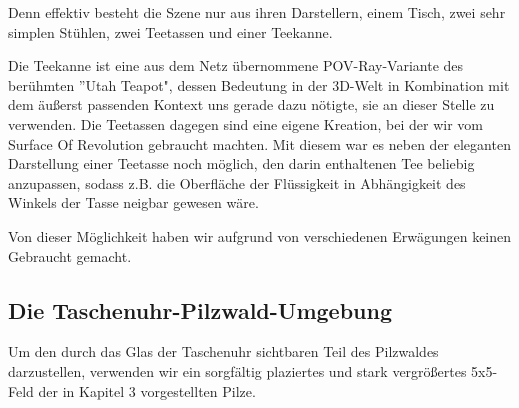 \documentclass[twocolumn]{article}
\begin{document}
Denn effektiv besteht die Szene nur aus ihren Darstellern, einem Tisch, zwei sehr simplen Stühlen, zwei Teetassen und einer Teekanne.

Die Teekanne ist eine aus dem Netz übernommene POV-Ray-Variante des berühmten ''Utah Teapot", dessen Bedeutung in der 3D-Welt in Kombination mit dem äußerst passenden Kontext uns gerade dazu nötigte, sie an dieser Stelle zu verwenden.
Die Teetassen dagegen sind eine eigene Kreation, bei der wir vom Surface Of Revolution gebraucht machten. Mit diesem war es neben der eleganten Darstellung einer Teetasse noch möglich, den darin enthaltenen Tee beliebig anzupassen, sodass z.B. die Oberfläche der Flüssigkeit in Abhängigkeit des Winkels der Tasse neigbar gewesen wäre.

Von dieser Möglichkeit haben wir aufgrund von verschiedenen Erwägungen keinen Gebraucht gemacht.


\subsection{Die Taschenuhr-Pilzwald-Umgebung}
Um den durch das Glas der Taschenuhr sichtbaren Teil des Pilzwaldes darzustellen, verwenden wir ein sorgfältig plaziertes und stark vergrößertes 5x5-Feld der in Kapitel 3 vorgestellten Pilze.
\end{document}
